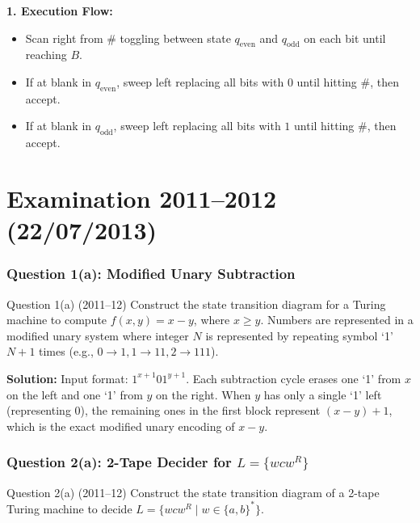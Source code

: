 \documentclass[11pt,a4paper]{article}
\begin{document}
\begin{solutionbox}
\textbf{1. Execution Flow:}
\begin{itemize}[leftmargin=*]
    \item Scan right from $\#$ toggling between state $q_{\text{even}}$ and $q_{\text{odd}}$ on each bit until reaching $B$.
    \item If at blank in $q_{\text{even}}$, sweep left replacing all bits with $0$ until hitting $\#$, then accept.
    \item If at blank in $q_{\text{odd}}$, sweep left replacing all bits with $1$ until hitting $\#$, then accept.
\end{itemize}
\end{solutionbox}

\part{Examination 2011--2012 (22/07/2013)}

\section{Question 1(a): Modified Unary Subtraction}
\begin{questionbox}{Question 1(a) (2011--12)}
Construct the state transition diagram for a Turing machine to compute $f(x, y) = x - y$, where $x \ge y$. Numbers are represented in a modified unary system where integer $N$ is represented by repeating symbol `1' $N+1$ times (e.g., $0 \rightarrow 1, 1 \rightarrow 11, 2 \rightarrow 111$).
\end{questionbox}

\begin{solutionbox}
\textbf{Solution:} Input format: $1^{x+1} 0 1^{y+1}$.
Each subtraction cycle erases one `1' from $x$ on the left and one `1' from $y$ on the right. When $y$ has only a single `1' left (representing $0$), the remaining ones in the first block represent $(x-y)+1$, which is the exact modified unary encoding of $x-y$.
\end{solutionbox}

\section{Question 2(a): 2-Tape Decider for $L = \{w c w^R\}$}
\begin{questionbox}{Question 2(a) (2011--12)}
Construct the state transition diagram of a 2-tape Turing machine to decide $L = \{w c w^R \mid w \in \{a, b\}^*\}$.
\end{questionbox}
\end{document}
